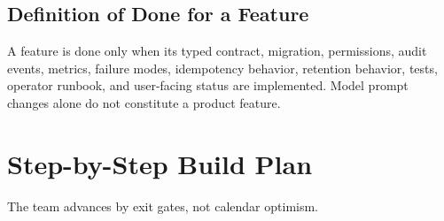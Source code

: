 \documentclass[10pt]{article}
\begin{document}
\subsection{Definition of Done for a Feature}

A feature is done only when its typed contract, migration, permissions, audit events, metrics, failure modes, idempotency behavior, retention behavior, tests, operator runbook, and user-facing status are implemented. Model prompt changes alone do not constitute a product feature.

\section{Step-by-Step Build Plan}\label{sec:build-plan}

The team advances by exit gates, not calendar optimism.
\end{document}
